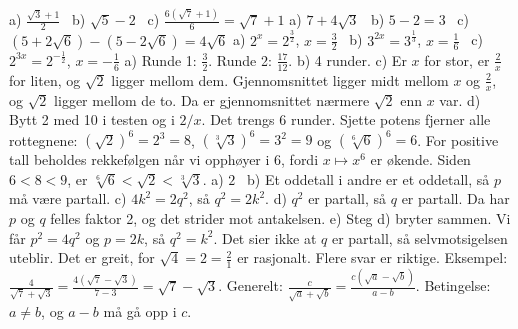  a) $\frac{\sqrt{3}+1}{2}$ \ b) $\sqrt{5}-2$ \ c) $\frac{6(\sqrt{7}+1)}{6} = \sqrt{7}+1$
 a) $7+4\sqrt{3}$ \ b) $5-2 = 3$ \ c) $(5+2\sqrt{6})-(5-2\sqrt{6}) = 4\sqrt{6}$
 a) $2^x = 2^{\tfrac32}$, $x = \frac32$ \ b) $3^{2x} = 3^{\tfrac13}$, $x = \frac16$ \ c) $2^{3x} = 2^{-\tfrac12}$, $x = -\frac16$
 a) Runde 1: $\frac{3}{2}$. Runde 2: $\frac{17}{12}$. b) 4 runder.
c) Er $x$ for stor, er $\frac{2}{x}$ for liten, og $\sqrt{2}$ ligger mellom dem. Gjennomsnittet ligger midt mellom $x$ og $\frac{2}{x}$, og $\sqrt{2}$ ligger mellom de to. Da er gjennomsnittet nærmere $\sqrt{2}$ enn $x$ var.
d) Bytt 2 med 10 i testen og i $2/x$. Det trengs 6 runder.
 Sjette potens fjerner alle rottegnene: $\left(\sqrt{2}\right)^6 = 2^3 = 8$, $\left(\sqrt[3]{3}\right)^6 = 3^2 = 9$ og $\left(\sqrt[6]{6}\right)^6 = 6$. For positive tall beholdes rekkefølgen når vi opphøyer i 6, fordi $x \mapsto x^6$ er økende. Siden $6 < 8 < 9$, er $\sqrt[6]{6} < \sqrt{2} < \sqrt[3]{3}$.
 a) $2$ \ b) Et oddetall i andre er et oddetall, så $p$ må være partall. c) $4k^2 = 2q^2$, så $q^2 = 2k^2$.
d) $q^2$ er partall, så $q$ er partall. Da har $p$ og $q$ felles faktor 2, og det strider mot antakelsen.
e) Steg d) bryter sammen. Vi får $p^2 = 4q^2$ og $p = 2k$, så $q^2 = k^2$. Det sier ikke at $q$ er partall, så selvmotsigelsen uteblir. Det er greit, for $\sqrt{4} = 2 = \frac21$ er rasjonalt.
 Flere svar er riktige. Eksempel: $\frac{4}{\sqrt{7}+\sqrt{3}} = \frac{4(\sqrt{7}-\sqrt{3})}{7-3} = \sqrt{7}-\sqrt{3}$.
Generelt: $\frac{c}{\sqrt{a}+\sqrt{b}} = \frac{c(\sqrt{a}-\sqrt{b})}{a-b}$. Betingelse: $a \neq b$, og $a-b$ må gå opp i $c$.
